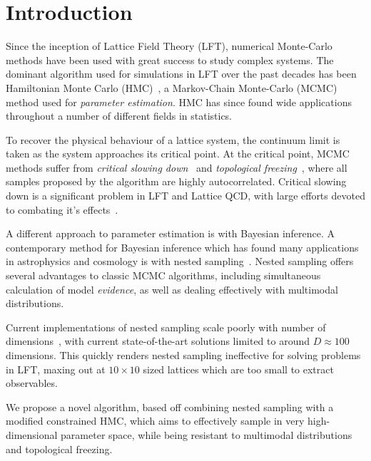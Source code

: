 \documentclass[11pt]{article}
\begin{document}
    \section{Introduction}\label{Introduction}
    Since the inception of Lattice Field Theory (LFT), numerical Monte-Carlo methods have been used with great success to
    study complex systems.
    The dominant algorithm used for simulations in LFT over the past decades has been Hamiltonian Monte Carlo
    (HMC)~\cite{HMC_Duane}, a Markov-Chain Monte-Carlo (MCMC) method used for \emph{parameter estimation}.
    HMC has since found wide applications throughout a number of different fields in statistics.

    To recover the physical behaviour of a lattice system, the continuum limit is taken as the system approaches its
    critical point.
    At the critical point, MCMC methods suffer from \emph{critical slowing down}~\cite{CriticalSlowingWOLFF} and
    \emph{topological freezing}~\cite{Hasenbusch_2018}, where all samples proposed by the algorithm are highly
    autocorrelated.
    Critical slowing down is a significant problem in LFT and Lattice QCD, with large efforts devoted to combating
    it's effects~\cite{Pawlowski_2020,Jansen_MLMC_2020,Albergo_Flow_LFT_2019, Hackett:2021idh,Abbott:2022hkm,Albergo:2022qfi}.

    A different approach to parameter estimation is with Bayesian inference.
    A contemporary method for Bayesian inference which has found many applications in astrophysics and cosmology
    is with nested sampling~\cite{Skilling2006,Handley_polychord}.
    Nested sampling offers several advantages to classic MCMC algorithms, including simultaneous calculation of model
    \emph{evidence}, as well as dealing effectively with multimodal distributions.

    Current implementations of nested sampling scale poorly with number of dimensions~\cite{Feroz_2009, Handley_2015},
    with current state-of-the-art solutions limited to around $D \approx 100$ dimensions.
    This quickly renders nested sampling ineffective for solving problems in LFT, maxing out at $10 \times 10$ sized
    lattices which are too small to extract observables.

    We propose a novel algorithm, based off combining nested sampling with a modified constrained HMC, which aims
    to effectively sample in very high-dimensional parameter space, while being resistant to multimodal distributions
    and topological freezing.
\end{document}
